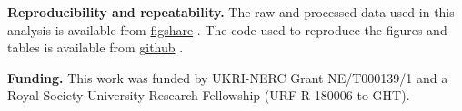 \documentclass[12pt,letterpaper]{article}
\begin{document}
\textbf{Reproducibility and repeatability.}
The raw and processed data used in this analysis is available from \href{https://figshare.com/articles/dataset/Innovation_and_elaboration_on_the_avian_tree_of_life/20480355}{figshare} \cite{fighsaredata}.
The code used to reproduce the figures and tables is available from \href{https://github.com/TGuillerme/elaboration_exploration_bird_beaks}{github} \cite{githubrepo}.

\textbf{Funding.}
This work was funded by UKRI-NERC Grant NE/T000139/1 and a Royal Society University Research Fellowship (URF R 180006 to GHT).




\end{document}
